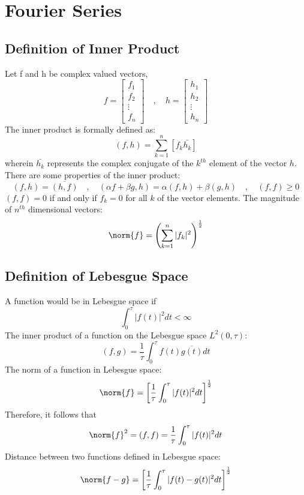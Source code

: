 \chapter{Fourier Series}
\begin{comment}
Fourier Transform Header
The Fourier Series in Trigonometric form,$$f(t) = \frac{1}{2}a_0 + \sum_{n = 1}^{\infty}\left[a_n \cos\left(\frac{n\pi}{L}t\right) + b_n \sin\left(\frac{n\pi}{L}t\right)\right]$$
\end{comment}
\section{Definition of Inner Product}
\begin{comment}
\end{comment}
Let f and h be complex valued vectors,$$f = \begin{bmatrix}f_1\\f_2\\\vdots \\f_n \end{bmatrix}\quad,\quad h = \begin{bmatrix}h_1\\h_2\\\vdots \\h_n \end{bmatrix}$$
The inner product is formally defined as:
$$(f,h) = \sum_{k = 1}^{n}\left[f_k\bar{h_k}\right]$$
wherein $\bar{h_k}$ represents the complex conjugate of the $k^{th}$ element of the vector $h$. There are some properties of the inner product:
$$(f,h) = \overline{(h,f)}\quad,\quad (\alpha f + \beta g,h) = \alpha(f,h) + \beta(g,h) \quad,\quad (f,f)\geq0$$
$(f,f) = 0$ if and only if $f_k = 0$ for all $k$ of the vector elements. The magnitude of $n^{th}$ dimensional vectors:
$$\norm{f} = \left(\sum_{k = 1}^{n}|f_k|^2\right)^{\frac{1}{2}}$$
\section{Definition of Lebesgue Space}
\begin{comment}
\end{comment}
A function would be in Lebesgue space if
$$\int^{\tau}_{0}|f(t)|^2dt < \infty$$
The inner product of a function on the Lebesgue space $L^2(0,\tau)$:
$$(f,g) = \frac{1}{\tau}\int^{\tau}_{0}f(t)\overline{g(t)}dt$$
The norm of a function in Lebesgue space:
$$\norm{f} = \left[\frac{1}{\tau}\int^{\tau}_{0}|f(t)|^2dt\right]^\frac{1}{2}$$
Therefore, it follows that 
$$\norm{f}^2 = (f,f) = \frac{1}{\tau}\int^{\tau}_{0}|f(t)|^2dt$$
Distance between two functions defined in Lebesgue space:
$$\norm{f - g} = \left[\frac{1}{\tau}\int^{\tau}_{0}|f(t) - g(t)|^2dt\right]^\frac{1}{2}$$
